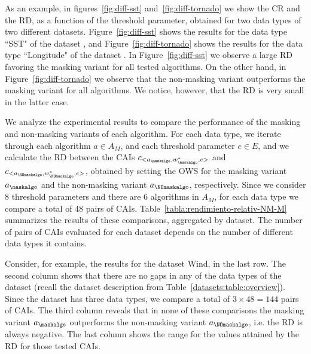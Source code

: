 \vspace{+2pt}
As an example, in figures~\ref{fig:diff-sst} and~\ref{fig:diff-tornado} we show the CR and the RD, as a function of the threshold parameter, obtained for two data types of two different datasets. Figure~\ref{fig:diff-sst} shows the results for the data type ``SST" of the dataset \datasetsst, and Figure~\ref{fig:diff-tornado} shows the results for the data type ``Longitude" of the dataset \datasettornado. In Figure~\ref{fig:diff-sst} we observe a large RD favoring the masking variant for all tested algorithms. On the other hand, in Figure~\ref{fig:diff-tornado} we observe that the non-masking variant outperforms the masking variant for all algorithms. We notice, however, that the RD is very small in the latter case.


\clearpage



\clearpage


We analyze the experimental results to compare the performance of the masking and non-masking variants of each algorithm. For each data type, we iterate through each algorithm $a \in A_M$, and each threshold parameter $e \in E$, and we calculate the RD between the CAIs $c_{<a_\maskalgo, w_\maskalgo^{*}, e>}$ and $c_{<a_\NOmaskalgo, w_\NOmaskalgo^{*}, e>}$, obtained by setting the OWS for the masking variant $a_\maskalgo$ and the non-masking variant $a_\NOmaskalgo$, respectively. Since we consider 8 threshold parameters and there are 6 algorithms in $A_M$, for each data type we compare a total of 48 pairs of CAIs. Table~\ref{tabla:rendimiento-relativ-NM-M} summarizes the results of these comparisons, aggregated by dataset. The number of pairs of CAIs evaluated for each dataset depends on the number of different data types it contains.


\vspace{+5pt}

\vspace{-5pt}


Consider, for example, the results for the dataset Wind, in the last row. The second column shows that there are no gaps in any of the data types of the dataset (recall the dataset description from Table~\ref{datasets:table:overview}). Since the dataset has three data types, we compare a total of $3\times48=144$ pairs of CAIs. The third column reveals that in none of these comparisons the masking variant $a_\maskalgo$ outperforms the non-masking variant $a_\NOmaskalgo$, i.e. the RD is always negative. The last column shows the range for the values attained by the RD for those tested CAIs.



